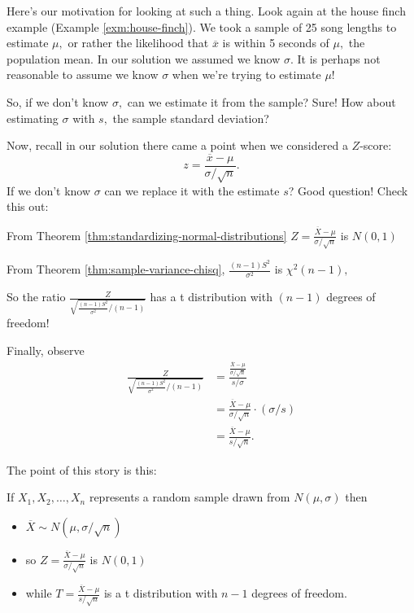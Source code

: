 \documentclass[
]{book}
\providecommand{\tightlist}{%
  \setlength{\itemsep}{0pt}\setlength{\parskip}{0pt}}
\theoremstyle{definition}
\theoremstyle{definition}
\theoremstyle{definition}
\theoremstyle{definition}
\theoremstyle{remark}
\begin{document}
Here's our motivation for looking at such a thing. Look again at the house finch example (Example \ref{exm:house-finch}). We took a sample of 25 song lengths to estimate \(\mu,\) or rather the likelihood that \(\overline{x}\) is within 5 seconds of \(\mu,\) the population mean. In our solution we assumed we know \(\sigma\). It is perhaps not reasonable to assume we know \(\sigma\) when we're trying to estimate \(\mu\)!

So, if we don't know \(\sigma,\) can we estimate it from the sample? Sure! How about estimating \(\sigma\) with \(s,\) the sample standard deviation?

Now, recall in our solution there came a point when we considered a \(Z\)-score:
\[z = \frac{\overline{x}-\mu}{\sigma/\sqrt{n}}.\]
If we don't know \(\sigma\) can we replace it with the estimate \(s\)?
Good question! Check this out:

From Theorem \ref{thm:standardizing-normal-distributions} \(\displaystyle Z =\frac{ \overline{X}-\mu}{\sigma/\sqrt{n}}\) is \(N(0,1)\)

From Theorem \ref{thm:sample-variance-chisq}, \(\displaystyle\frac{(n-1)S^2}{\sigma^2}\) is \(\chi^2(n-1),\)

So the ratio \(\displaystyle\frac{Z}{\sqrt{\frac{(n-1)S^2}{\sigma^2}\big/(n-1)}}\) has a t distribution with \((n-1)\) degrees of freedom!

Finally, observe
\begin{align*}
  \frac{Z}{\sqrt{\frac{(n-1)S^2}{\sigma^2}\big/(n-1)}} &= \frac{\frac{\overline{X}-\mu}{\sigma/\sqrt{n}}}{s/\sigma} \\
  &= \frac{\overline{X}-\mu}{\sigma/\sqrt{n}} \cdot (\sigma/s) \\
  &= \frac{\overline{X}-\mu}{s/\sqrt{n}}.
\end{align*}

The point of this story is this:

If \(X_1,X_2,\ldots, X_n\) represents a random sample drawn from \(N(\mu,\sigma)\) then

\begin{itemize}
\tightlist
\item
  \(\displaystyle \overline{X} \sim N(\mu,\sigma/\sqrt{n})\)
\item
  so \(\displaystyle Z = \frac{\overline{X}-\mu}{\sigma/\sqrt{n}}\) is \(N(0,1)\)
\item
  while \(\displaystyle T = \frac{\overline{X}-\mu}{s/\sqrt{n}}\) is a t distribution with \(n-1\) degrees of freedom.
\end{itemize}
\end{document}
